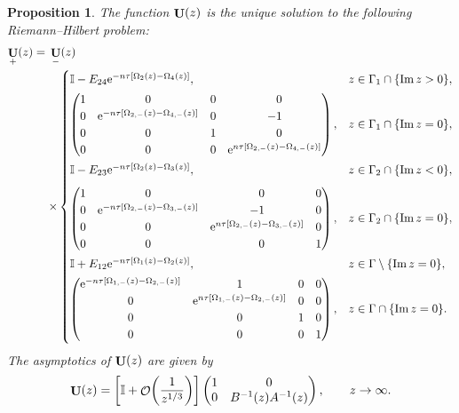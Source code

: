 \documentclass[pdftex]{sigma}
\DeclareMathOperator{\OO}{\mathcal{O}}
\DeclareMathOperator{\UU}{{\bf U}}
\numberwithin{equation}{section}
\newtheorem{Proposition}[Theorem]{Proposition}
 { \theoremstyle{definition}
\newtheorem{Definition}[Theorem]{Definition}
\newtheorem{Note}[Theorem]{Note}
\newtheorem{Example}[Theorem]{Example}
\newtheorem{Remark}[Theorem]{Remark} }
\begin{document}
 \begin{Proposition}
 The function $\UU(z)$ is the unique solution to the following Riemann--Hilbert problem:
 \begin{align*}%
 \UU_{+}(z)={}& \UU_{-}(z) \nonumber\\
 &{\times} \begin{cases}
 \mathbb{I} - E_{24}{\rm e}^{-n\tau[\Omega_2(z) - \Omega_4(z)]},
 & z \in \Gamma_1 \cap \{\operatorname{Im} z > 0\}, \vspace{1mm}\\
 \begin{pmatrix}
 1 & 0 & 0 & \hphantom{-}0 \\
 0 & {\rm e}^{-n\tau[\Omega_{2,-}(z)-\Omega_{4,-}(z)]} & 0 & -1\\
 0 & 0 & 1 & \hphantom{-}0 \\
 0 & 0 & 0 & {\rm e}^{n\tau[\Omega_{2,-}(z)-\Omega_{4,-}(z)]}
 \end{pmatrix},
 & z \in \Gamma_1 \cap \{\operatorname{Im} z = 0\},\vspace{1mm}\\
 \mathbb{I} - E_{23}{\rm e}^{-n\tau[\Omega_2(z) - \Omega_3(z)]},
 & z \in \Gamma_2 \cap \{\operatorname{Im} z < 0\}, \vspace{2mm}\\
 \begin{pmatrix}
 1 & 0 & \hphantom{-}0 & 0 \\
 0 & {\rm e}^{-n\tau[\Omega_{2,-}(z) - \Omega_{3,-}(z)]} & -1 & 0\\
 0 & 0 & {\rm e}^{n\tau[\Omega_{2,-}(z) - \Omega_{3,-}(z)]} & 0 \\
 0 & 0 & \hphantom{-}0 & 1
 \end{pmatrix},
 & z \in \Gamma_2 \cap \{\operatorname{Im} z = 0\}, \vspace{1mm}\\
 \mathbb{I} + E_{12}{\rm e}^{-n\tau[\Omega_1(z) - \Omega_2(z)]},
 & z\in \Gamma \setminus \{\operatorname{Im} z = 0\}, \vspace{1mm}\\
 \begin{pmatrix}
 {\rm e}^{-n\tau[\Omega_{1,-}(z)-\Omega_{2,-}(z)]} & 1 & 0 & 0\\
 0 & {\rm e}^{n\tau[\Omega_{1,-}(z)-\Omega_{2,-}(z)]} & 0 & 0\\
 0 & 0 & 1 & 0 \\
 0 & 0 & 0 & 1
 \end{pmatrix},
 & z\in \Gamma \cap \{\operatorname{Im} z = 0\}.
 \end{cases}
 \end{align*}
 The asymptotics of $\UU(z)$ are given by
 \begin{equation*} %
 \UU(z) =
 \biggl[\mathbb{I} + \OO\biggl(\frac{1}{z^{1/3}}\biggr)\biggr]\begin{pmatrix}
 1 & 0\\
 0 & B^{-1}(z) A^{-1}(z)
 \end{pmatrix}, \qquad z\to \infty.
 \end{equation*}
\end{Proposition}
\end{document}
